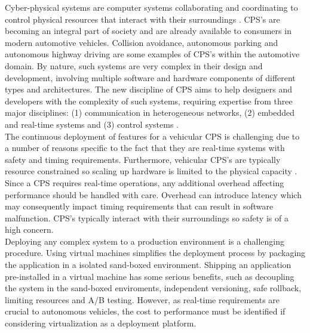 Cyber-physical systems are computer systems collaborating and coordinating to control physical resources that interact with their surroundings \cite{cps}. CPS's are becoming an integral part of society and are already available to consumers in modern automotive vehicles. Collision avoidance, autonomous parking and autonomous highway driving are some examples of CPS's within the automotive domain. By nature, such systems are very complex in their design and development, involving multiple software and hardware components of different types and architectures. The new discipline of CPS aims to help designers and developers with the complexity of such systems, requiring expertise from three major disciplines: (1) communication in heterogeneous networks, (2) embedded and real-time systems and (3) control systems \cite{gonz}. \\

The continuous deployment of features for a vehicular CPS is challenging due to a number of reasons specific to the fact that they are real-time systems with safety and timing requirements. Furthermore, vehicular CPS's are typically resource constrained so scaling up hardware is limited to the physical capacity \cite{wan2011advances}. Since a CPS requires real-time operations, any additional overhead affecting performance should be handled with care. Overhead can introduce latency which may consequently impact timing requirements that can result in software malfunction. CPS's typically interact with their surroundings so safety is of a high concern. \\

Deploying any complex system to a production environment is a challenging procedure. Using virtual machines simplifies the deployment process by packaging the application in a isolated sand-boxed environment. Shipping an application pre-installed in a virtual machine has some serious benefits, such as decoupling the system in the sand-boxed enviroments, independent versioning, safe rollback, limiting resources and A/B testing. However, as real-time requirements are crucial to autonomous vehicles, the cost to performance must be identified if considering virtualization as a deployment platform.\\


